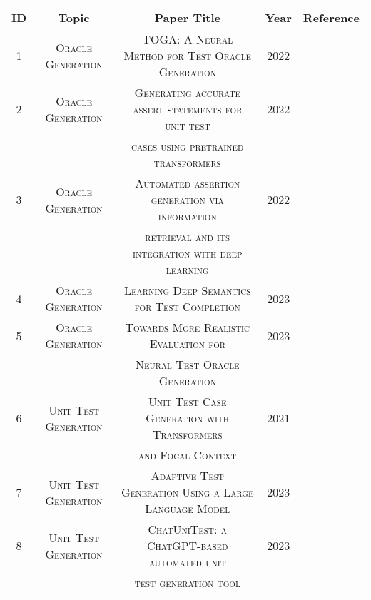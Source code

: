 \begin{table}[H]
\centering


    \begin{tabular}{c|c|c|c|c}
        \hline
        \textbf{ID} & \textbf{Topic} & \textbf{Paper Title} & \textbf{Year} & \textbf{Reference}\\
        \hline 
        1 & \scriptsize\textsc{Oracle Generation} & \scriptsize\textsc{TOGA: A Neural Method for Test Oracle Generation} & 2022 & \cite{gabriel_ryan_toga_2022}\\
        
        2 & \scriptsize\textsc{Oracle Generation} & \scriptsize\textsc{Generating accurate assert statements for unit test} & 2022 & \cite{tufano_generating_2022}\\
        & & \scriptsize\textsc{cases using pretrained transformers} & & \\
        
        3 & \scriptsize\textsc{Oracle Generation} & \scriptsize\textsc{Automated assertion generation via information} & 2022 & \cite{yu_automated_2022}\\
        & & \scriptsize\textsc{retrieval and its integration with deep learning} & & \\
        
        4 & \scriptsize\textsc{Oracle Generation} & \scriptsize\textsc{Learning Deep Semantics for Test Completion} & 2023 & \cite{nie_learning_2023}\\

        5 & \scriptsize\textsc{Oracle Generation} & \scriptsize\textsc{Towards More Realistic Evaluation for} & 2023 & \cite{liu_towards_2023}\\
        & & \scriptsize\textsc{Neural Test Oracle Generation} & & \\
        
        6 & \scriptsize\textsc{Unit Test Generation} & \scriptsize\textsc{Unit Test Case Generation with Transformers} & 2021 & \cite{tufano_unit_2021}\\
        & & \scriptsize\textsc{and Focal Context} & & \\
        
        7 & \scriptsize\textsc{Unit Test Generation} & \scriptsize\textsc{Adaptive Test Generation Using a Large Language Model} & 2023 & \cite{schafer_adaptive_2023}\\
        
        8 & \scriptsize\textsc{Unit Test Generation} & \scriptsize\textsc{ChatUniTest: a ChatGPT-based automated unit} & 2023 & \cite{xie_chatunitest_2023}\\
        & & \scriptsize\textsc{test generation tool} & & \\
        

\end{tabular}
\end{table}

